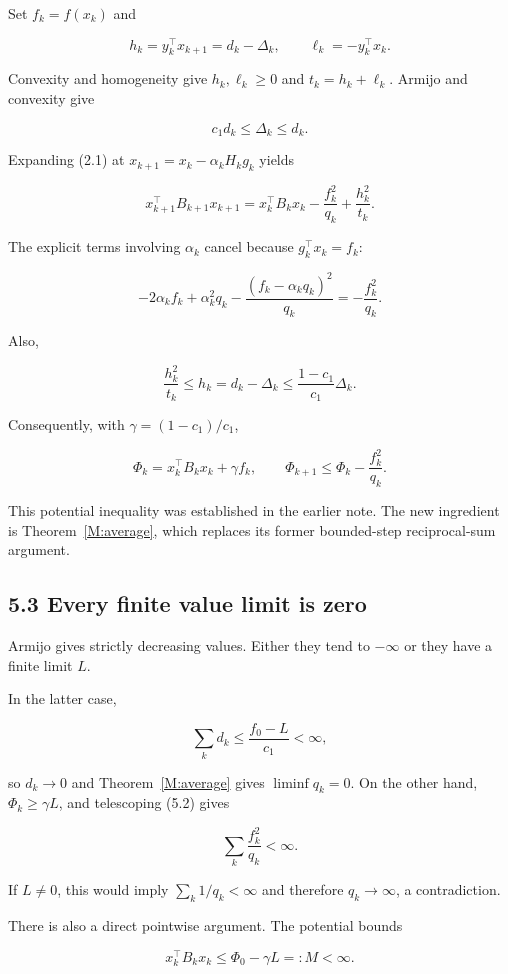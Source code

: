 Set \(f_k=f(x_k)\) and

\[
h_k=y_k^\top x_{k+1}=d_k-\Delta_k,\qquad
\ell_k=-y_k^\top x_k.
\]

Convexity and homogeneity give \(h_k,\ell_k\ge0\) and
\(t_k=h_k+\ell_k\). Armijo and convexity give

\[
c_1d_k\le\Delta_k\le d_k.
\]

Expanding (2.1) at \(x_{k+1}=x_k-\alpha_kH_kg_k\) yields

\[
\boxed{
x_{k+1}^\top B_{k+1}x_{k+1}
=x_k^\top B_kx_k-\frac{f_k^2}{q_k}+\frac{h_k^2}{t_k}.
}
\tag{H.5.1}
\]

The explicit terms involving \(\alpha_k\) cancel because
\(g_k^\top x_k=f_k\):

\[
-2\alpha_k f_k+\alpha_k^2q_k
-\frac{(f_k-\alpha_kq_k)^2}{q_k}
=-\frac{f_k^2}{q_k}.
\]

Also,

\[
\frac{h_k^2}{t_k}\le h_k=d_k-\Delta_k
\le\frac{1-c_1}{c_1}\Delta_k.
\]

Consequently, with \(\gamma=(1-c_1)/c_1\),

\[
\Phi_k=x_k^\top B_kx_k+\gamma f_k,
\qquad
\boxed{\Phi_{k+1}\le\Phi_k-\frac{f_k^2}{q_k}.}
\tag{H.5.2}
\]

This potential inequality was established in the earlier note. The new
ingredient is Theorem~\ref{M:average}, which replaces its former bounded-step
reciprocal-sum argument.

\subsection{5.3 Every finite value limit is
zero}\label{H:every-finite-value-limit-is-zero}

Armijo gives strictly decreasing values. Either they tend to \(-\infty\)
or they have a finite limit \(L\).

In the latter case,

\[
\sum_k d_k\le\frac{f_0-L}{c_1}<\infty,
\]

so \(d_k\to0\) and Theorem~\ref{M:average} gives \(\liminf q_k=0\). On the other hand,
\(\Phi_k\ge\gamma L\), and telescoping (5.2) gives

\[
\sum_k\frac{f_k^2}{q_k}<\infty.
\]

If \(L\ne0\), this would imply \(\sum_k1/q_k<\infty\) and therefore
\(q_k\to\infty\), a contradiction.

There is also a direct pointwise argument. The potential bounds

\[
x_k^\top B_kx_k\le\Phi_0-\gamma L=:M<\infty.
\]

